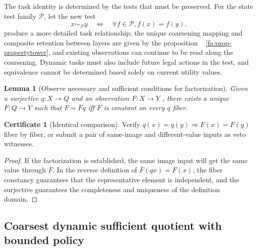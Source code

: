 \documentclass[11pt,a4paper]{article}
\theoremstyle{plain}
\newtheorem{lemma}[theorem]{Lemma}
\theoremstyle{definition}
\newtheorem*{certificate}{Certificate}
\theoremstyle{remark}
\begin{document}
\begin{CJK*}
The task identity is determined by the tests that must be preserved. For the state test family $\mathcal P$, let the new test \[
 x\sim_{\mathcal P}y\quad\Longleftrightarrow\quad
 \forall f\in\mathcal P, f(x)=f(y).
\] produce a more detailed task relationship; the unique coarsening mapping and composite retention between layers are given by the proposition ~ \ref{fa:prop-propertytower}, and existing observations can continue to be read along the coarsening. Dynamic tasks must also include future legal actions in the test, and equivalence cannot be determined based solely on current utility values.

\begin{lemma}
[Observe necessary and sufficient conditions for factorization]\label{pc:factorization}
Given a surjective $q:X\to Q$ and an observation $F:X\to Y$ , there exists a unique $\bar F:Q\to Y$ such that $F=\bar Fq$ iff $F$ is constant on every $q$ fiber.\end{lemma}
\begin{certificate}
[Identical comparison]Verify $q(x)=q(y)\Rightarrow F(x)=F(y)$ fiber by fiber, or submit a pair of same-image and different-value inputs as veto witnesses.\end{certificate}
\begin{proof}
If the factorization is established, the same image input will get the same value through $\bar F$. In the reverse definition of $\bar F(qx)=F(x)$, the fiber constancy guarantees that the representative element is independent, and the surjective guarantees the completeness and uniqueness of the definition domain.\end{proof}


\subsection { Coarsest dynamic sufficient quotient with bounded policy }


\end{CJK*}
\end{document}
